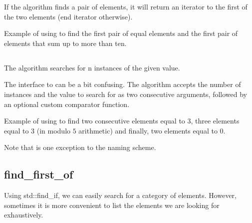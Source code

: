
If the algorithm finds a pair of elements, it will return an iterator to the first of the two elements (end iterator otherwise).

\begin{box-note}
\footnotesize Example of using  to find the first pair of equal elements and the first pair of elements that sum up to more than ten.
\tcblower
{}
\end{box-note}

\subsection{\texorpdfstring{}{\texttt{std::search\_n}}}

The  algorithm searches for n instances of the given value.


The interface to  can be a bit confusing. The algorithm accepts the number of instances and the value to search for as two consecutive arguments, followed by an optional custom comparator function.

\begin{box-note}
\footnotesize Example of using  to find two consecutive elements equal to $3$, three elements equal to $3$ (in modulo $5$ arithmetic) and finally, two elements equal to $0$.
\tcblower
{}
\end{box-note}

Note that  is one exception to the  naming scheme.

\subsection{find\_first\_of}

Using std::find\_if, we can easily search for a category of elements. However, sometimes it is more convenient to list the elements we are looking for exhaustively.


